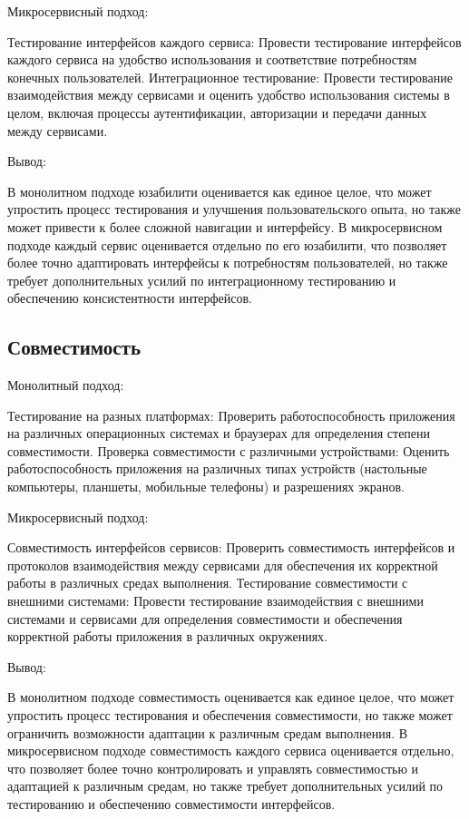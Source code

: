 Микросервисный подход:

    Тестирование интерфейсов каждого сервиса: Провести тестирование интерфейсов каждого сервиса на удобство использования и соответствие потребностям конечных пользователей.
    Интеграционное тестирование: Провести тестирование взаимодействия между сервисами и оценить удобство использования системы в целом, включая процессы аутентификации, авторизации и передачи данных между сервисами.

Вывод:

    В монолитном подходе юзабилити оценивается как единое целое, что может упростить процесс тестирования и улучшения пользовательского опыта, но также может привести к более сложной навигации и интерфейсу.
    В микросервисном подходе каждый сервис оценивается отдельно по его юзабилити, что позволяет более точно адаптировать интерфейсы к потребностям пользователей, но также требует дополнительных усилий по интеграционному тестированию и обеспечению консистентности интерфейсов.

\subsection{Совместимость}

Монолитный подход:

    Тестирование на разных платформах: Проверить работоспособность приложения на различных операционных системах и браузерах для определения степени совместимости.
    Проверка совместимости с различными устройствами: Оценить работоспособность приложения на различных типах устройств (настольные компьютеры, планшеты, мобильные телефоны) и разрешениях экранов.

Микросервисный подход:

    Совместимость интерфейсов сервисов: Проверить совместимость интерфейсов и протоколов взаимодействия между сервисами для обеспечения их корректной работы в различных средах выполнения.
    Тестирование совместимости с внешними системами: Провести тестирование взаимодействия с внешними системами и сервисами для определения совместимости и обеспечения корректной работы приложения в различных окружениях.

Вывод:

    В монолитном подходе совместимость оценивается как единое целое, что может упростить процесс тестирования и обеспечения совместимости, но также может ограничить возможности адаптации к различным средам выполнения.
    В микросервисном подходе совместимость каждого сервиса оценивается отдельно, что позволяет более точно контролировать и управлять совместимостью и адаптацией к различным средам, но также требует дополнительных усилий по тестированию и обеспечению совместимости интерфейсов.

